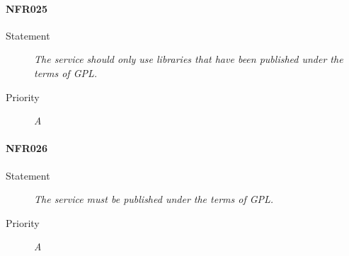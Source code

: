 \paragraph{NFR025}
\begin{description}
  \item [Statement] 
    \textit{The service should only use libraries that have been published under the terms of \gls{GPL}.}
  \item [Priority] \textit{A}
\end{description}

\paragraph{NFR026}
\begin{description}
  \item [Statement] 
    \textit{The service must be published under the terms of \gls{GPL}.}
  \item [Priority] \textit{A}
\end{description}
